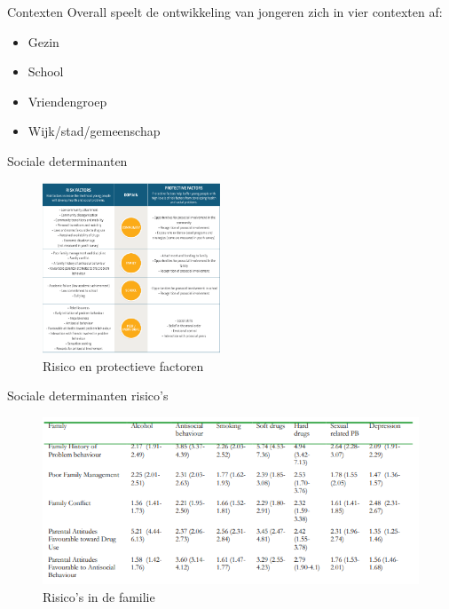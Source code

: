 \documentclass[
  ignorenonframetext,
]{beamer}
\providecommand{\tightlist}{%
  \setlength{\itemsep}{0pt}\setlength{\parskip}{0pt}}\usepackage{longtable,booktabs,array}
\begin{document}
\begin{frame}{Contexten}
\protect\hypertarget{contexten}{}
Overall speelt de ontwikkeling van jongeren zich in vier contexten af:

\begin{itemize}
\tightlist
\item
  Gezin\\
\item
  School\\
\item
  Vriendengroep\\
\item
  Wijk/stad/gemeenschap
\end{itemize}
\end{frame}

\begin{frame}{Sociale determinanten}
\protect\hypertarget{sociale-determinanten}{}
\begin{figure}

{\centering \includegraphics[width=2.08333in,height=\textheight]{images/Determinanten.png}

}

\caption{Risico en protectieve factoren}

\end{figure}
\end{frame}

\begin{frame}{Sociale determinanten risico's}
\protect\hypertarget{sociale-determinanten-risicos}{}
\begin{figure}

{\centering \includegraphics{images/RFFamilie.png}

}

\caption{Risico's in de familie}

\end{figure}
\end{frame}
\end{document}
